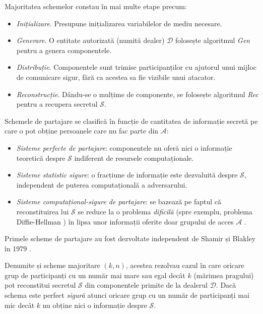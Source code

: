 \documentclass[oneside, 12pt]{book}
\begin{document}
Majoritatea schemelor constau în mai multe etape precum:
\begin{itemize}
	\item \textit{Inițializare}. Presupune inițializarea variabilelor de mediu necesare.
	\item \textit{Generare}. O entitate autorizată (numită dealer) $\mathcal{D}$ folosește algoritmul \textit{Gen} pentru a genera componentele.
	\item \textit{Distribuție}. Componentele sunt trimise participanților cu ajutorul unui mijloc de comunicare sigur, fără ca acestea sa fie vizibile unui atacator.
	\item \textit{Reconstrucție}. Dându-se o mulțime de componente, se folosește algoritmul \textit{Rec} pentru a recupera secretul
	$\mathcal{S}$.
\end{itemize}

Schemele de partajare se clasifică în funcție de cantitatea de informație secretă pe care o pot obține persoanele care nu fac parte din $\mathcal{A}$:
\begin{itemize}
	\item \textit{Sisteme perfecte de partajare}: componentele nu oferă nici o informație teoretică despre $\mathcal{S}$ indiferent de resursele computaționale.
	\item \textit{Sisteme statistic sigure}: o fracțiune de informație este dezvaluită despre $\mathcal{S}$, independent de puterea computațională a adversarului.
	\item \textit{Sisteme computațional-sigure de partajare}: se bazează pe faptul că reconstituirea lui $\mathcal{S}$ se reduce la o problema \textit{dificilă} (spre exemplu, problema Diffie-Hellman \cite{boneh:1998decision} ) în lipsa unor informații oferite doar grupului de acces $\mathcal{A}$ \cite{Martin:2008}.

\end{itemize} 

Primele scheme de partajare au fost dezvoltate independent de Shamir și Blakley în 1979 \cite{B:1979, S:1979}.

Denumite și scheme majoritare $(k, n)$, acestea rezolvau cazul în care oricare grup de participanți cu un număr mai mare sau egal decât $k$  (mărimea pragului) pot reconstitui secretul $\mathcal{S}$ din componentele primite de la dealerul $\mathcal{D}$. Dacă schema este perfect \textit{sigură} atunci oricare grup cu un număr de participanți mai mic decât $k$ nu obține nici o informație despre $\mathcal{S}$.
\end{document}
